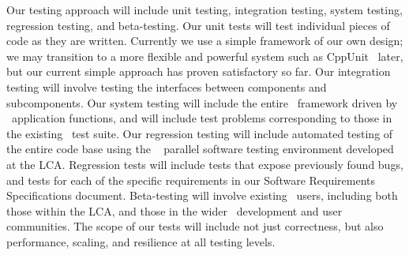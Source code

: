 \documentclass[11pt,letterpaper]{article}
\begin{document}
Our testing approach will include unit testing, integration testing,
system testing, regression testing, and beta-testing.  Our unit tests
will test individual pieces of code as they are written.  Currently we
use a simple framework of our own design; we may transition to a more
flexible and powerful system such as CppUnit~\cite{wwwcppunit} later,
but our current simple approach has proven satisfactory so far.  Our
integration testing will involve testing the interfaces between
components and subcomponents.  Our system testing will include the
entire \cello\ framework driven by \enzoii\ application functions, and
will include test problems corresponding to those in the existing
\enzo\ test suite.  Our regression testing will include automated
testing of the entire code base using the \lcatest~\cite{wwwlcatest}
parallel software testing environment developed at the LCA.
Regression tests will include tests that expose previously found bugs,
and tests for each of the specific requirements in our Software
Requirements Specifications document.  Beta-testing will involve
existing \enzo\ users, including both those within the LCA, and those in the
wider \enzo\ development and user communities.  The scope of our tests will
include not just correctness, but also performance, scaling, and
resilience at all testing levels.  

\end{document}
